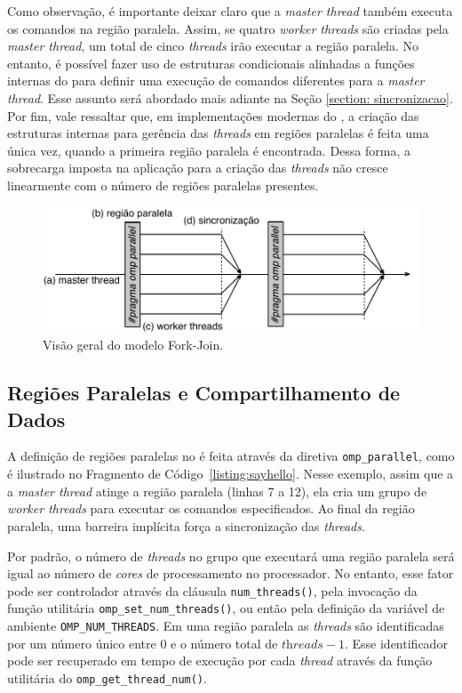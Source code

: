 \documentclass{SBCbookchapter}
\begin{document}
		Como observação, é importante deixar claro que a \textit{master
		thread} também executa os comandos na região paralela. Assim, se
		quatro \textit{worker threads} são criadas pela \textit{master
		thread}, um total de cinco \textit{threads} irão executar a
		região paralela.  No entanto, é possível fazer uso de estruturas
		condicionais alinhadas a funções internas do \openmp para
		definir uma execução de comandos diferentes para a
		\textit{master thread}. Esse assunto será abordado mais adiante
		na Seção \ref{section: sincronizacao}. Por fim, vale ressaltar
		que, em implementações modernas do \openmp, a criação das
		estruturas internas para gerência das \textit{threads} em
		regiões paralelas é feita uma única vez, quando a primeira
		região paralela é encontrada. Dessa forma, a sobrecarga imposta
		na aplicação para a criação das \textit{threads} não cresce
		linearmente com o número de regiões paralelas presentes.

			\begin{figure}[t]
				\centering
				\includegraphics[width=0.8\linewidth]{img/fork-join}
				\caption{Visão geral do modelo Fork-Join.}\label{fig:fork-join}
			\end{figure}

	\subsection{Regiões Paralelas e Compartilhamento de Dados}

		A definição de regiões paralelas no \openmp é feita através da
		diretiva \texttt{omp\_parallel}, como é ilustrado no Fragmento
		de Código~\ref{listing:sayhello}.  Nesse exemplo, assim que a a
		\textit{master thread} atinge a região paralela (linhas 7 a 12),
		ela cria um grupo de \textit{worker threads} para executar os
		comandos especificados. Ao final da região paralela, uma
		barreira implícita força a sincronização das \textit{threads}.
		
		Por padrão, o número de \textit{threads} no grupo que executará
		uma região paralela será igual ao número de \textit{cores} de
		processamento no processador. No entanto, esse fator pode ser
		controlador através da cláusula \texttt{num\_threads()}, pela
		invocação da função utilitária
		\texttt{omp\_set\_num\_threads()}, ou então pela definição da
		variável de ambiente \texttt{OMP\_NUM\_THREADS}. Em uma região
		paralela as \textit{threads} são identificadas por um número
		único entre $0$ e o número total de $\textit{threads} - 1$.
		Esse identificador pode ser recuperado em tempo de execução por
		cada \textit{thread} através da função utilitária do \openmp
		\texttt{omp\_get\_thread\_num()}.
\end{document}
